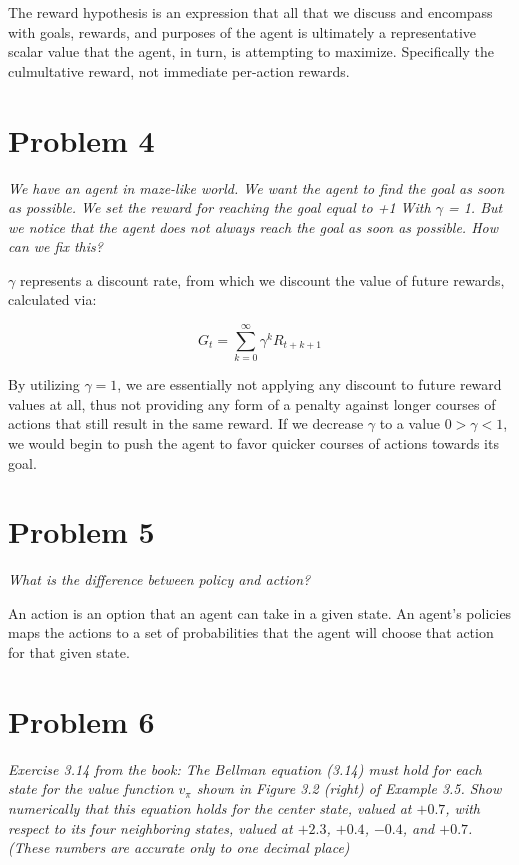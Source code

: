 \documentclass{article}
\begin{document}
The reward hypothesis is an expression that all that we discuss and encompass with goals, rewards, and purposes of the agent is ultimately a representative scalar value that the agent, in turn, is attempting to maximize. Specifically the culmultative reward, not immediate per-action rewards.

\section*{Problem 4}

\textit{We have an agent in maze-like world. We want the agent to find the goal as soon as possible. We set the reward for reaching the goal equal to +1 With $\gamma$ = 1. But we notice that the agent does not always reach the goal as soon as possible. How can we fix this?}

$\gamma$ represents a discount rate, from which we discount the value of future rewards, calculated via:

\begin{equation}
    G_t = \sum_{k=0}^{\infty} \gamma^k R_{t+k+1}
\end{equation}

By utilizing $\gamma=1$, we are essentially not applying any discount to future reward values at all, thus not providing any form of a penalty against longer courses of actions that still result in the same reward. If we decrease $\gamma$ to a value $0 > \gamma < 1$, we would begin to push the agent to favor quicker courses of actions towards its goal.

\section*{Problem 5}

\textit{What is the difference between policy and action?}

An action is an option that an agent can take in a given state. An agent's policies maps the actions to a set of probabilities that the agent will choose that action for that given state.

\section*{Problem 6}

\textit{Exercise 3.14 from the book: The Bellman equation (3.14) must hold for each state for the value function $v_\pi$ shown in Figure 3.2 (right) of Example 3.5. Show numerically that this equation holds for the center state, valued at $+0.7$, with respect to its four neighboring states, valued at $+2.3$, $+0.4$, $-0.4$, and $+0.7$. (These numbers are accurate only to one decimal place)}
\end{document}
